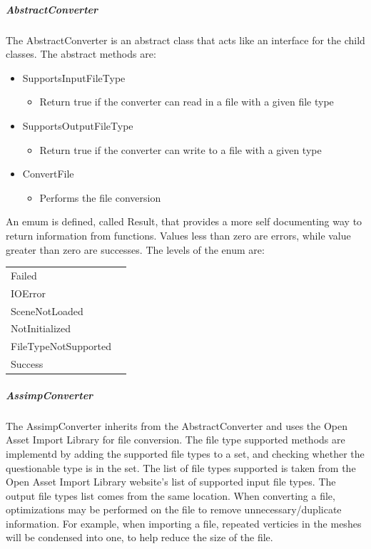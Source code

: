     \subparagraph{AbstractConverter}
    \hfill \break
    The AbstractConverter is an abstract class that acts like an interface for the child classes.  The abstract methods are:
    \begin{itemize}
        \item SupportsInputFileType
        \begin{itemize}
            \item Return true if the converter can read in a file with a given file type
        \end{itemize}

        \item SupportsOutputFileType
        \begin{itemize}
            \item Return true if the converter can write to a file with a given type
        \end{itemize}

        \item ConvertFile
        \begin{itemize}
            \item Performs the file conversion
        \end{itemize}
    \end{itemize}

    An emum is defined, called Result, that provides a more self documenting way to return information from functions.  Values less than zero are errors, while
    value greater than zero are successes.  The levels of the enum are:
    
    \begin{tabular}{l l}
        \centering
        Failed &\\
        IOError &\\
        SceneNotLoaded &\\
        NotInitialized &\\
        FileTypeNotSupported &\\
        Success &
    \end{tabular}

    \subparagraph{AssimpConverter}
    \hfill \break
    The AssimpConverter inherits from the AbstractConverter and uses the Open Asset Import Library for file conversion.  
    The file type supported methods are implementd by adding the supported file types to a set, and checking whether the questionable type is in the set.
    The list of file types supported is taken from the Open Asset Import Library website's list of supported input file types.  
    The output file types list comes from the same location.
    When converting a file, optimizations may be performed on the file to remove unnecessary/duplicate information.  For example, when importing a file, 
    repeated verticies in the meshes will be condensed into one, to help reduce the size of the file.

